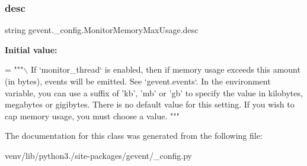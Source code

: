 \subsubsection{\texorpdfstring{desc}{desc}}
{\footnotesize\ttfamily string gevent.\+\_\+config.\+Monitor\+Memory\+Max\+Usage.\+desc\hspace{0.3cm}{\ttfamily [static]}}

{\bfseries Initial value\+:}
\begin{DoxyCode}
=  \textcolor{stringliteral}{"""\(\backslash\)}
\textcolor{stringliteral}{If `monitor\_thread` is enabled,}
\textcolor{stringliteral}{then if memory usage exceeds this amount (in bytes), events will}
\textcolor{stringliteral}{be emitted. See `gevent.events`. In the environment variable, you can use}
\textcolor{stringliteral}{a suffix of 'kb', 'mb' or 'gb' to specify the value in kilobytes, megabytes}
\textcolor{stringliteral}{or gigibytes.}
\textcolor{stringliteral}{}
\textcolor{stringliteral}{There is no default value for this setting. If you wish to}
\textcolor{stringliteral}{cap memory usage, you must choose a value.}
\textcolor{stringliteral}{"""}
\end{DoxyCode}


The documentation for this class was generated from the following file\+:\begin{DoxyCompactItemize}
\item 
venv/lib/python3./site-\/packages/gevent/\+\_\+config.\+py\end{DoxyCompactItemize}
